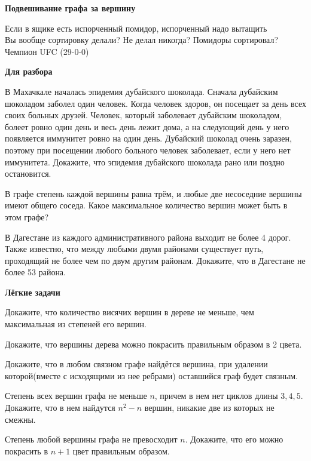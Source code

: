\centerline{\bf \Huge Подвешивание графа за вершину}    

\begin{flushright}
        \scriptsize{Если в ящике есть испорченный помидор, испорченный надо вытащить\\
                    Вы вообще сортировку делали? Не делал никогда? Помидоры сортировал?\\
                    Чемпион UFC (29-0-0)}
\end{flushright}

\centerline{\bf \large Для разбора}

В Махачкале началась эпидемия дубайского шоколада. Сначала дубайским шоколадом заболел один человек. Когда человек здоров, он посещает за день всех своих больных друзей. Человек, который заболевает дубайским шоколадом, болеет ровно один день и весь день лежит дома, а на следующий день у него появляется иммунитет ровно на один день. Дубайский шоколад очень заразен, поэтому при посещении любого больного человек заболевает, если у него нет иммунитета. Докажите, что эпидемия дубайского шоколада рано или поздно остановится.

В графе степень каждой вершины равна трём, и любые две несоседние вершины имеют общего соседа. Какое максимальное количество вершин может быть в этом графе?

В Дагестане из каждого административного района выходит не более 4 дорог. Также известно, что между любыми двумя районами существует путь, проходящий не более чем по двум другим районам. Докажите, что в Дагестане не более 53 района.

\centerline{\bf \large Лёгкие задачи}

Докажите, что количество висячих вершин в дереве не меньше, чем максимальная из степеней его вершин.

Докажите, что вершины дерева можно покрасить правильным образом в 2 цвета.

Докажите, что в любом связном графе найдётся вершина, при удалении которой(вместе с исходящими из нее ребрами) оставшийся граф будет связным.

Степень всех вершин графа не меньше $n$, причем в нем нет циклов длины $3,4,5$. Докажите, что в нем найдутся $n^2-n$ вершин, никакие две из которых не смежны.

Степень любой вершины графа не превосходит $n$. Докажите, что его можно покрасить в $n +1$   цвет правильным образом.

